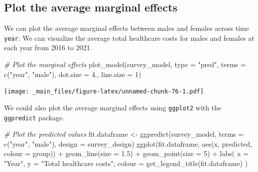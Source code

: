 \documentclass[
]{book}
\newenvironment{Shaded}{\begin{snugshade}}{\end{snugshade}}
\newcommand{\AttributeTok}[1]{\textcolor[rgb]{0.77,0.63,0.00}{#1}}
\newcommand{\CommentTok}[1]{\textcolor[rgb]{0.56,0.35,0.01}{\textit{#1}}}
\newcommand{\DecValTok}[1]{\textcolor[rgb]{0.00,0.00,0.81}{#1}}
\newcommand{\FloatTok}[1]{\textcolor[rgb]{0.00,0.00,0.81}{#1}}
\newcommand{\FunctionTok}[1]{\textcolor[rgb]{0.00,0.00,0.00}{#1}}
\newcommand{\NormalTok}[1]{#1}
\newcommand{\OtherTok}[1]{\textcolor[rgb]{0.56,0.35,0.01}{#1}}
\newcommand{\SpecialCharTok}[1]{\textcolor[rgb]{0.00,0.00,0.00}{#1}}
\newcommand{\StringTok}[1]{\textcolor[rgb]{0.31,0.60,0.02}{#1}}
\begin{document}
\hypertarget{plot-the-average-marginal-effects}{%
\subsection{Plot the average marginal effects}\label{plot-the-average-marginal-effects}}

We can plot the average marginal effects between males and females across time \texttt{year}. We can visualize the average total healthcare costs for males and females at each year from 2016 to 2021.

\begin{Shaded}
\begin{Highlighting}[]
\CommentTok{\# Plot the marginal effects}
\FunctionTok{plot\_model}\NormalTok{(survey\_model, }\AttributeTok{type =} \StringTok{"pred"}\NormalTok{, }\AttributeTok{terms =} \FunctionTok{c}\NormalTok{(}\StringTok{"year"}\NormalTok{, }\StringTok{"male"}\NormalTok{), }\AttributeTok{dot.size =} \FloatTok{4.}\NormalTok{, }\AttributeTok{line.size =} \DecValTok{1}\NormalTok{)}
\end{Highlighting}
\end{Shaded}

\texttt{[image: \_main\_files/figure-latex/unnamed-chunk-76-1.pdf]}

We could also plot the average marginal effects using \texttt{ggplot2} with the \texttt{ggpredict} package.

\begin{Shaded}
\begin{Highlighting}[]
\CommentTok{\# Plot the predicted values}
\NormalTok{fit.dataframe }\OtherTok{\textless{}{-}} \FunctionTok{ggpredict}\NormalTok{(survey\_model, }\AttributeTok{terms =} \FunctionTok{c}\NormalTok{(}\StringTok{"year"}\NormalTok{, }\StringTok{"male"}\NormalTok{), }\AttributeTok{design =}\NormalTok{ survey\_design)}
\FunctionTok{ggplot}\NormalTok{(fit.dataframe, }\FunctionTok{aes}\NormalTok{(x, predicted, }\AttributeTok{colour =}\NormalTok{ group)) }\SpecialCharTok{+}
  \FunctionTok{geom\_line}\NormalTok{(}\AttributeTok{size =} \FloatTok{1.5}\NormalTok{) }\SpecialCharTok{+}
  \FunctionTok{geom\_point}\NormalTok{(}\AttributeTok{size =} \DecValTok{5}\NormalTok{) }\SpecialCharTok{+} 
  \FunctionTok{labs}\NormalTok{(}
    \AttributeTok{x =} \StringTok{"Year"}\NormalTok{,}
    \AttributeTok{y =} \StringTok{"Total healthcare costs"}\NormalTok{,}
    \AttributeTok{colour =} \FunctionTok{get\_legend\_title}\NormalTok{(fit.dataframe)}
\NormalTok{  )}
\end{Highlighting}
\end{Shaded}
\end{document}
